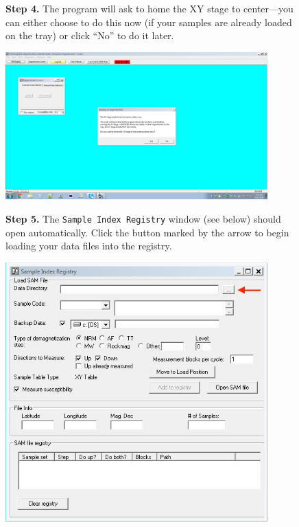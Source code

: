 \documentclass[11pt,letterpaper]{article}
\begin{document}
\begin{figure}
\begin{flushleft}
\textbf{Step 4.}
The program will ask to home the XY stage to center---you can either choose to do this now (if your samples are already loaded on the tray) or click ``No'' to do it later.
\end{flushleft}
\centering
\includegraphics[width=0.9\textwidth]{images/Capture3.jpg}
\end{figure}

\begin{figure}
\begin{flushleft}
\textbf{Step 5.}
The \texttt{Sample Index Registry} window (see below) should open automatically. Click the button marked by the arrow to begin loading your data files into the registry.
\end{flushleft}
\centering
\includegraphics[width=0.9\textwidth]{images/Capture4.jpg}
\end{figure}
\end{document}
